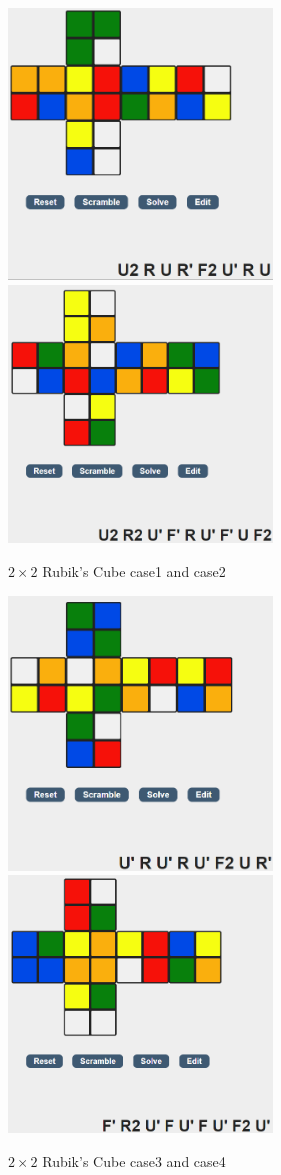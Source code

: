 ﻿\documentclass[a4paper, 11pt]{article}
\begin{document}
\begin{figure}[ht]
  \centering
  \includegraphics[width=7cm]{Pic/case1}
  \quad
  \includegraphics[width=7cm]{Pic/case2}
  \caption{$2\times 2$ Rubik's Cube case1 and case2 }
\end{figure}
\begin{figure}[ht]
  \centering
  \includegraphics[width=7cm]{Pic/case3}
  \quad
  \includegraphics[width=7cm]{Pic/case4}
  \caption{$2\times 2$ Rubik's Cube case3 and case4}
\end{figure}
\end{document}
